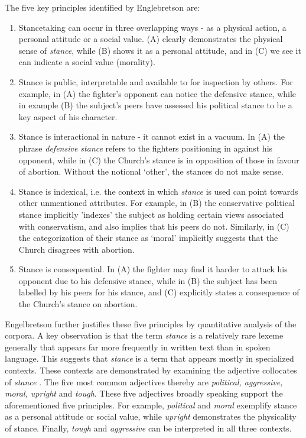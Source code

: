 \documentclass[Dissertation.tex]{subfiles}
\begin{document}
The five key principles identified by Englebretson \cite{englebretsonStancetakingDiscourseSubjectivity2007} are:
\begin{enumerate}
	\item Stancetaking can occur in three overlapping ways - as a physical action, a personal attitude or a social value. (A) clearly demonstrates the physical sense of \textit{stance}, while (B) shows it as a personal attitude, and in (C) we see it can indicate a social value (morality). 
	
	\item Stance is public, interpretable and available to for inspection by others. For example, in (A) the fighter's opponent can notice the defensive stance, while in example (B) the subject's peers have assessed his political stance to be a key aspect of his character.
	
	\item Stance is interactional in nature - it cannot exist in a vacuum. In (A) the  phrase \textit{defensive stance} refers to the fighters positioning in against his opponent, while in (C) the Church's stance is in opposition of those in favour of abortion. Without the notional `other', the stances do not make sense.
	
	\item Stance is indexical, i.e. the context in which \textit{stance} is used can point towards other unmentioned attributes. For example, in (B) the conservative political stance implicitly 'indexes' the subject as holding certain views  associated with conservatism, and also implies that his peers do not. Similarly, in (C) the categorization of their stance as `moral' implicitly suggests that the Church disagrees with abortion.
	
	\item Stance is consequential. In (A) the fighter may find it harder to attack his opponent due to his defensive stance, while in (B) the subject has been labelled by his peers for his stance, and (C) explicitly states a consequence of the Church's stance on abortion.
\end{enumerate}

Engelbretson \cite{englebretsonStancetakingDiscourseSubjectivity2007} further justifies these five principles by quantitative analysis of the corpora. A key observation is that the term \textit{stance} is a relatively rare lexeme generally that appears far more frequently in written text than in spoken language. This suggests that \textit{stance} is a term that appears mostly in specialized contexts. These contexts are demonstrated by examining the adjective collocates of \textit{stance} \cite{englebretsonStancetakingDiscourseSubjectivity2007}. The five most common adjectives thereby are \textit{political, aggressive, moral, upright} and \textit{tough}. These five adjectives broadly speaking support the aforementioned five principles. For example, \textit{political} and \textit{moral} exemplify stance as a personal attitude or social value, while \textit{upright} demonstrates the physicality of stance. Finally, \textit{tough} and \textit{aggressive} can be interpreted in all three contexts.
\end{document}
